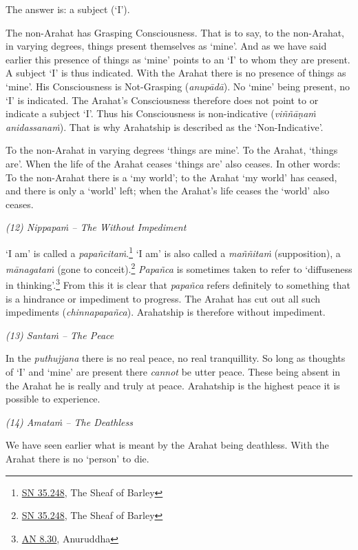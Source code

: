 The answer is: a subject (`I').

The non-Arahat has Grasping Consciousness. That is to say, to the non-Arahat, in varying degrees, things present themselves as `mine'. And as we have said earlier this presence of things as `mine' points to an `I' to whom they are present. A subject `I' is thus indicated. With the Arahat there is no presence of things as `mine'. His Consciousness is Not-Grasping (\textit{anupādā}). No `mine' being present, no `I' is indicated. The Arahat's Consciousness therefore does not point to or indicate a subject `I'. Thus his Consciousness is non-indicative (\textit{viññāṇaṁ anidassanaṁ}). That is why Arahatship is described as the `Non-Indicative'.

To the non-Arahat in varying degrees `things are mine'. To the Arahat, `things are'. When the life of the Arahat ceases `things are' also ceases. In other words: To the non-Arahat there is a `my world'; to the Arahat `my world' has ceased, and there is only a `world' left; when the Arahat's life ceases the `world' also ceases.

\emph{(12) Nippapaṁ -- The Without Impediment}

`I am' is called a \textit{papañcitaṁ}.\footnote{\href{https://suttacentral.net/sn35.248/en/bodhi}{SN 35.248}, The Sheaf of Barley} `I am' is also called a \textit{maññitaṁ} (supposition), a \textit{mānagataṁ} (gone to conceit).\footnote{\href{https://suttacentral.net/sn35.248/en/bodhi}{SN 35.248}, The Sheaf of Barley} \textit{Papañca} is sometimes taken to refer to `diffuseness in thinking'.\footnote{\href{https://suttacentral.net/an8.30/en/bodhi}{AN 8.30}, Anuruddha} From this it is clear that \textit{papañca} refers definitely to something that is a hindrance or impediment to progress. The Arahat has cut out all such impediments (\textit{chinnapapañca}). Arahatship is therefore without impediment.

\emph{(13) Santaṁ -- The Peace}

In the \textit{puthujjana} there is no real peace, no real tranquillity. So long as thoughts of `I' and `mine' are present there \emph{cannot} be utter peace. These being absent in the Arahat he is really and truly at peace. Arahatship is the highest peace it is possible to experience.

\emph{(14) Amataṁ -- The Deathless}

We have seen earlier what is meant by the Arahat being deathless. With the Arahat there is no `person' to die.

